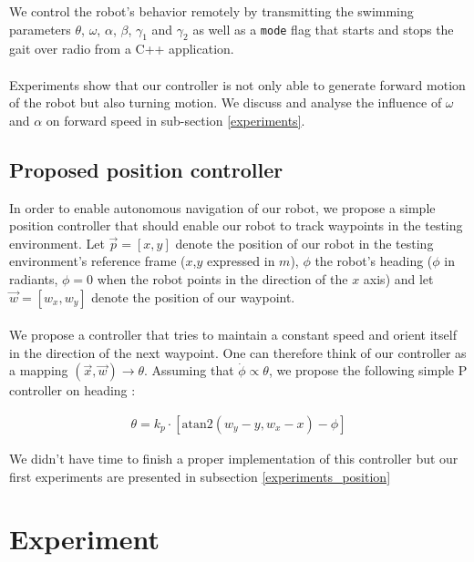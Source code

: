 \documentclass[11pt]{article}
\begin{document}
We control the robot's behavior remotely by transmitting the swimming parameters $\theta$, $\omega$, $\alpha$, $\beta$, $\gamma_1$ and $\gamma_2$ as well as a \texttt{mode} flag that starts and stops the gait over radio from a C++ application. 
\\ \\
Experiments show that our controller is not only able to generate forward motion of the robot but also turning motion. We discuss and analyse the influence of $\omega$ and $\alpha$ on forward speed in sub-section \ref{experiments}.

\subsection{Proposed position controller}

In order to enable autonomous navigation of our robot, we propose a simple position controller that should enable our robot to track waypoints in the testing environment. Let $\vec{p}=[x,y]$ denote the position of our robot in the testing environment's reference frame ($x$,$y$ expressed in $m$), $\phi$ the robot's heading ($\phi$ in radiants, $\phi = 0$ when the robot points in the direction of the $x$ axis) and let $\vec{w} = [w_x,w_y]$ denote the position of our waypoint. 
\\ \\
We propose a controller that tries to maintain a constant speed and orient itself in the direction of the next waypoint. One can therefore think of our controller as a mapping $(\vec{x},\vec{w}) \rightarrow \theta$. Assuming that $\Dot{\phi} \propto \theta$, we propose the following simple P controller on heading :

\begin{equation}
\label{p_controller}
\begin{aligned}
    \theta = k_p \cdot \left[ \text{atan2}(w_y - y,w_x-x) - \phi \right]
\end{aligned}
\end{equation}

We didn't have time to finish a proper implementation of this controller but our first experiments are presented in subsection \ref{experiments_position}

\section{Experiment}
\end{document}
